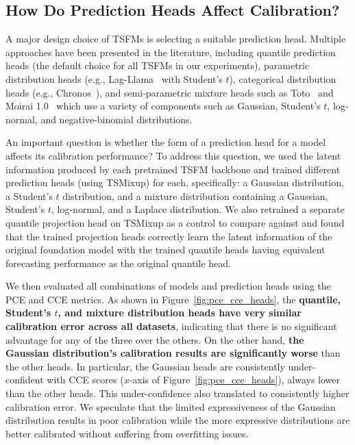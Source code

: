 \documentclass{article}
\begin{document}
\subsection{How Do Prediction Heads Affect Calibration?}
\label{sec:prediction_heads}

A major design choice of TSFMs is selecting a suitable prediction head. 
Multiple approaches have been presented in the literature, including quantile prediction heads (the default choice for all TSFMs in our experiments), parametric distribution heads (e.g., Lag-Llama~\citep{lagllama} with Student's $t$), categorical distribution heads (e.g., Chronos~\citep{chronos}), and semi-parametric mixture heads such as Toto~\citep{toto} and Moirai 1.0~\citep{moirai} which use a variety of components such as Gaussian, Student's $t$, log-normal, and negative-binomial distributions.

An important question is whether the form of a prediction head for a model affects its calibration performance? 
To address this question, we used the latent information produced by each pretrained TSFM backbone and trained different prediction heads (using TSMixup) for each, specifically: a Gaussian distribution, a Student's $t$ distribution, and a mixture distribution containing a Gaussian, Student's $t$, log-normal, and a Laplace distribution.
We also retrained a separate quantile projection head on TSMixup as a control to compare against and found that the trained projection heads correctly learn the latent information of the original foundation model with the trained quantile heads having equivalent forecasting performance as the original quantile head.

We then evaluated all combinations of models and prediction heads using the PCE and CCE metrics. 
As shown in Figure~\ref{fig:pce_cce_heads}, the \textbf{quantile, Student's $t$, and mixture distribution heads have very similar calibration error across all datasets}, indicating that there is no significant advantage for any of the three over the others.
On the other hand, \textbf{the Gaussian distribution's calibration results are significantly worse} than the other heads.
In particular, the Gaussian heads are consistently under-confident with CCE scores ($x$-axis of Figure~\ref{fig:pce_cce_heads}), always lower than the other heads.
This under-confidence also translated to consistently higher calibration error. 
We speculate that the limited expressiveness of the Gaussian distribution results in poor calibration while the more expressive distributions are better calibrated without suffering from overfitting issues.
\end{document}
